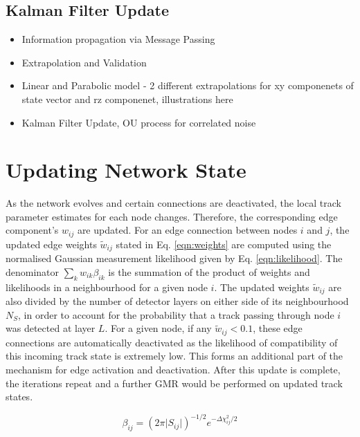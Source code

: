 \subsection{Kalman Filter Update}

\begin{itemize}
    \item Information propagation via Message Passing
    \item Extrapolation and Validation
    \item Linear and Parabolic model - 2 different extrapolations for xy componenets of state vector and rz componenet, illustrations here
    \item Kalman Filter Update, OU process for correlated noise
\end{itemize}



\section{Updating Network State}
\label{gnn-updating-network-state}

As the network evolves and certain connections are deactivated, the local track parameter estimates for each node changes. Therefore, the corresponding edge component's $w_{ij}$ are updated. For an edge connection between nodes $i$ and $j$, the updated edge weights $\widetilde{w}_{ij}$ stated in Eq. \eqref{eqn:weights} are computed using the normalised Gaussian measurement likelihood given by Eq. \eqref{eqn:likelihood}. The denominator $\sum_{k}w_{ik}\beta_{ik}$ is the summation of the product of weights and likelihoods in a neighbourhood for a given node $i$. The updated weights $\widetilde{w}_{ij}$ are also divided by the number of detector layers on either side of its neighbourhood $N_S$, in order to account for the probability that a track passing through node $i$ was detected at layer $L$. For a given node, if any $\widetilde{w}_{ij} < 0.1$, these edge connections are automatically deactivated as the likelihood of compatibility of this incoming track state is extremely low. This forms an additional part of the mechanism for edge activation and deactivation. After this update is complete, the iterations repeat and a further GMR would be performed on updated track states. 

\begin{equation}
\beta_{ij} = (2 \pi \lvert S_{ij} \rvert )^{-1/2}  e^{-\Delta \chi^{2}_{ij} / 2}
\label{eqn:likelihood}
\end{equation}

